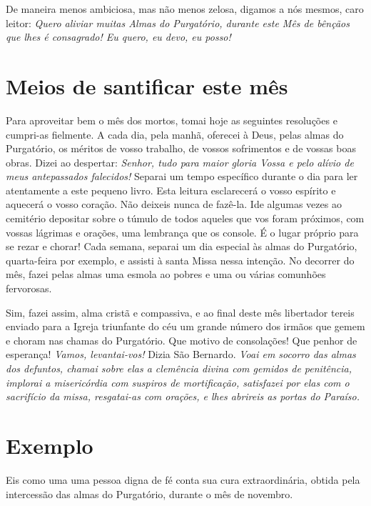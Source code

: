 De maneira menos ambiciosa, mas não menos zelosa, digamos a nós mesmos, caro leitor: \textit{Quero aliviar muitas Almas do Purgatório, durante este Mês de bênçãos que lhes é consagrado! Eu quero, eu devo, eu posso!}


\section*{Meios de santificar este mês}

Para aproveitar bem o mês dos mortos, tomai hoje as seguintes resoluções e cumpri-as fielmente. A cada dia, pela manhã, oferecei à Deus, pelas almas do Purgatório, os méritos de vosso trabalho, de vossos sofrimentos e de vossas boas obras. Dizei ao despertar: \textit{Senhor, tudo para maior gloria Vossa e pelo alívio de meus antepassados falecidos!} Separai um tempo específico durante o dia para ler atentamente a este pequeno livro. Esta leitura esclarecerá o vosso espírito e aquecerá o vosso coração. Não deixeis nunca de fazê-la. Ide algumas vezes ao cemitério depositar sobre o túmulo de todos aqueles que vos foram próximos, com vossas lágrimas e orações, uma lembrança que os console. É o lugar próprio para se rezar e chorar! Cada semana, separai um dia especial às almas do Purgatório, quarta-feira por exemplo, e assisti à santa Missa nessa intenção. No decorrer do mês, fazei pelas almas uma esmola ao pobres e uma ou várias comunhões fervorosas.

Sim, fazei assim, alma cristã e compassiva, e ao final deste mês libertador tereis enviado para a Igreja triunfante do céu um grande número dos irmãos que gemem e choram nas chamas do Purgatório. Que motivo de consolações! Que penhor de esperança! \textit{Vamos, levantai-vos!} Dizia São Bernardo. \textit{Voai em socorro das almas dos defuntos, chamai sobre elas a clemência divina com gemidos de penitência, implorai a misericórdia com suspiros de mortificação, satisfazei por elas com o sacrifício da missa, resgatai-as com orações, e lhes abrireis as portas do Paraíso.}


\section*{Exemplo }

Eis como uma uma pessoa digna de fé conta sua cura extraordinária, obtida pela intercessão das almas do Purgatório, durante o mês de novembro.

